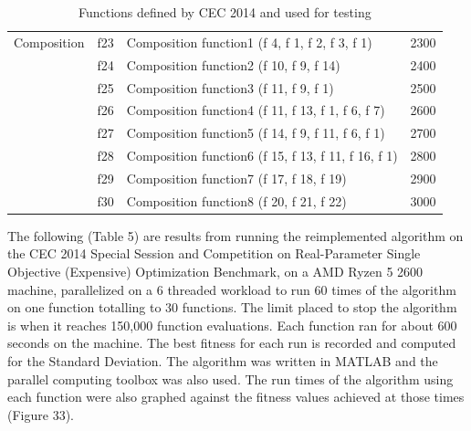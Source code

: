\begin{table}[]
\begin{tabular}{llll}
  Composition
    & f23 & Composition function1 (f 4, f 1, f 2, f 3, f 1) & 2300 \\
    & f24 & Composition function2 (f 10, f 9, f 14) & 2400 \\
    & f25 & Composition function3 (f 11, f 9, f 1) & 2500 \\
    & f26 & Composition function4 (f 11, f 13, f 1, f 6, f 7) & 2600 \\
    & f27 & Composition function5 (f 14, f 9, f 11, f 6, f 1) & 2700 \\
    & f28 & Composition function6 (f 15, f 13, f 11, f 16, f 1) & 2800 \\
    & f29 & Composition function7 (f 17, f 18, f 19) & 2900 \\
    & f30 & Composition function8 (f 20, f 21, f 22) & 3000
\end{tabular}
\caption{Functions defined by CEC 2014 and used for testing}
\end{table}

\clearpage

The following (Table 5) are results from running the reimplemented algorithm on the CEC 2014 Special Session and Competition on Real-Parameter Single Objective (Expensive) Optimization Benchmark\cite{liang_2013}, on a AMD Ryzen 5 2600 machine, parallelized on a 6 threaded workload to run 60 times of the algorithm on one function totalling to 30 functions. The limit placed to stop the algorithm is when it reaches 150,000 function evaluations. Each function ran for about 600 seconds on the machine. The best fitness for each run is recorded and computed for the Standard Deviation. The algorithm was written in MATLAB and the parallel computing toolbox was also used. The run times of the algorithm using each function were also graphed against the fitness values achieved at those times (Figure 33).


